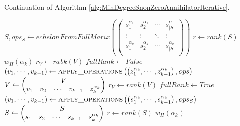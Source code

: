 \documentclass[11pt]{llncs}
\begin{document}
\newpage
\begin{algorithm}
	\caption{Continuation of Algorithm \ref{alg:MinDegreeSnonZeroAnnihilatorIterative}.}\label{alg:continueationMinDegreeSnonZeroAnnihilatorIterative}
	\begin{algorithmic}
		\State $S, ops_S \gets echelonFromFullMarix\left(
		\begin{pmatrix}
		s_1^{\alpha_1} &  s_2^{\alpha_1} & \cdots & s_{|S|}^{\alpha_{1}}\\
		\vdots &  \vdots & \ddots & \vdots\\
		s_{1}^{\alpha_k} &  s_{2}^{\alpha_k} & \cdots & s_{|S|}^{\alpha_{k}}\\
		\end{pmatrix}\right)$
		\State $r \gets rank(S)$
		\State \Return $w_H\left(\alpha_k\right)$
		\EndIf
		\State $r_V \gets rabk(V)$
		\State $fullRank \gets False$
		\State $\left(v_1, \cdots, v_{k-1}\right) \gets \mbox{\textsc{apply\_operations}}\left(\left(z_1^{\alpha_k}, \cdots, z_{k-1}^{\alpha_k}\right), ops\right)$ 
		\State $V \gets \begin{pmatrix}
			\multicolumn{5}{c}{\multirow{1}{*}{$V$}} \\
			v_1 & v_2 & \cdots & v_{k-1} & z_{k}^{\alpha_k}
		\end{pmatrix}$
		\State $r_V \gets rank(V)$
		\State $fullRank \gets True$
		\EndIf
		\State $\left(v_1, \cdots, v_{k-1}\right) \gets \mbox{\textsc{apply\_operations}}\left(\left(s_1^{\alpha_k}, \cdots, s_{k-1}^{\alpha_k}\right), ops_S\right)$ 
		\State $S \gets \begin{pmatrix}
		\multicolumn{5}{c}{\multirow{1}{*}{$S$}} \\
		s_1 & s_2 & \cdots & s_{k-1} & s_{k}^{\alpha_k}
		\end{pmatrix}$
		\State $r \gets rank(S)$
		\State \Return $w_H\left(\alpha_k\right)$
		\EndIf
		\EndWhile
	\end{algorithmic}
\end{algorithm}
\end{document}
